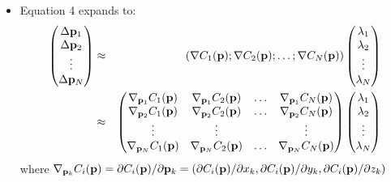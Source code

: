 \documentclass[10pt]{article}
\begin{document}
\begin{itemize}
    \item Equation 4 expands to:
        \begin{eqnarray*}
            \begin{pmatrix}
                \Delta{\bf p}_1 \\
                \Delta{\bf p}_2 \\
                \vdots \\
                \Delta{\bf p}_N
            \end{pmatrix}
            &\approx&
            \left(\nabla C_1({\bf p}); \nabla C_2({\bf p}); \hdots; \nabla C_N({\bf p})\right)
            \begin{pmatrix}
                \lambda_1 \\
                \lambda_2 \\
                \vdots \\
                \lambda_N
            \end{pmatrix}\\
            &\approx&
            \begin{pmatrix}
                \nabla_{{\bf p}_1} C_1({\bf p}) &  \nabla_{{\bf p}_1} C_2({\bf p}) & \hdots  & \nabla_{{\bf p}_1} C_N({\bf p}) \\
                \nabla_{{\bf p}_2} C_1({\bf p}) &  \nabla_{{\bf p}_2} C_2({\bf p}) & \hdots  & \nabla_{{\bf p}_2} C_N({\bf p}) \\
                \vdots & \vdots & & \vdots \\
                \nabla_{{\bf p}_N} C_1({\bf p})  &  \nabla_{{\bf p}_N} C_2({\bf p}) & \hdots  & \nabla_{{\bf p}_N} C_N({\bf p}) \\
            \end{pmatrix}
            \begin{pmatrix}
                \lambda_1 \\
                \lambda_2 \\
                \vdots \\
                \lambda_N
            \end{pmatrix}\\            
        \end{eqnarray*}
        where $\nabla_{{\bf p}_k} C_i({\bf p}) = \partial C_i ({\bf p}) / \partial {\bf p}_k =  (\partial C_i({\bf p}) / \partial x_k, \partial C_i({\bf p}) / \partial y_k, \partial C_i({\bf p}) / \partial z_k)$
    

\end{itemize}
\end{document}
